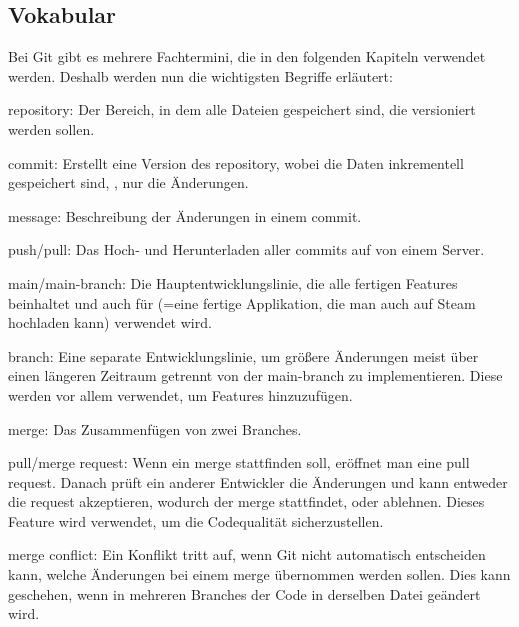\renewcommand{\kapitelautor}{Autor: Felix Zwickelstorfer}
\subsection{Vokabular}\label{subsec:git-vokabular}


\renewcommand{\kapitelautor}{Autor: Felix Zwickelstorfer}

Bei Git gibt es mehrere Fachtermini, die in den folgenden Kapiteln verwendet werden.
Deshalb werden nun die wichtigsten Begriffe erläutert:

\begin{liste}
    \item repository: Der Bereich, in dem alle Dateien gespeichert sind, die versioniert werden sollen.
    \item commit: Erstellt eine Version des repository, wobei die Daten inkrementell gespeichert sind, \dah, nur die Änderungen.
    \item message: Beschreibung der Änderungen in einem commit.
    \item push/pull: Das Hoch- und Herunterladen aller commits auf \bzw von einem Server.
    \item main/main-branch: Die Hauptentwicklungslinie, die alle fertigen Features beinhaltet und auch für  (=eine fertige Applikation, die man auch auf Steam hochladen kann) verwendet wird.
    \item branch: Eine separate Entwicklungslinie, um größere Änderungen meist über einen längeren Zeitraum getrennt von der main-branch zu implementieren.
    Diese werden vor allem verwendet, um Features hinzuzufügen.
    \item merge: Das Zusammenfügen von zwei Branches.
    \item pull/merge request: Wenn ein merge stattfinden soll, eröffnet man eine pull request.
    Danach prüft ein anderer Entwickler die Änderungen und kann entweder die request akzeptieren, wodurch der merge stattfindet, oder ablehnen.
    Dieses Feature wird verwendet, um die Codequalität sicherzustellen.
    \item merge conflict: Ein Konflikt tritt auf, wenn Git nicht automatisch entscheiden kann, welche Änderungen bei einem merge übernommen werden sollen.
    Dies kann geschehen, wenn in mehreren Branches der Code in derselben Datei geändert wird.
\end{liste}
